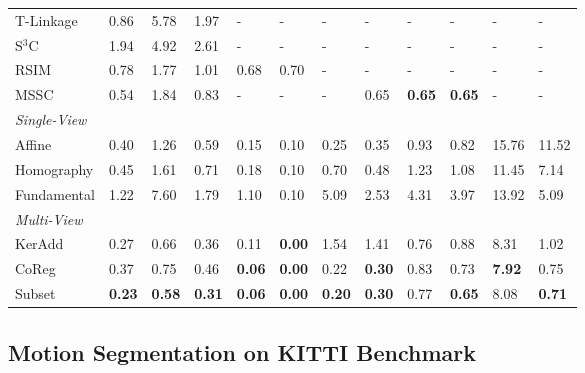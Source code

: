 \documentclass[10pt,twocolumn,letterpaper]{article}
\begin{document}
\begin{table*}[htbp]
{\begin{tabular}{llllllllllll}
    \multicolumn{1}{l}{T-Linkage \cite{Magri2014}} & 0.86  & 5.78  & 1.97  & -     & -     & -     & -     & -     & - & - & - \\
    S$^3$C  \cite{Li2015} & 1.94  & 4.92  & 2.61  & -     & -     & -     & -     & -     & - & - & - \\
    RSIM \cite{Ji2016} & 0.78 & 1.77 & 1.01 & 0.68 & 0.70 & - & - & - & - & - & - \\
    \multicolumn{1}{l}{MSSC \cite{Lai2017}} & 0.54  & 1.84  & 0.83  & -     & -     & -     & 0.65  & \textbf{0.65}  & \textbf{0.65} & - & - \\
    \midrule
    \textit{Single-View} & \multicolumn{11}{l}{} \\
    \midrule
    Affine & 0.40  & 1.26  & 0.59  & 0.15  & {0.10} &   0.25   & 0.35  & 0.93  & 0.82 & 15.76 & 11.52 \\
    Homography & 0.45  & 1.61  & 0.71  & 0.18  & {0.10} &   0.70   & 0.48  & 1.23  & 1.08 & 11.45 & 7.14 \\
    Fundamental & 1.22  & 7.60  & 1.79  & 1.10  & {0.10} &   5.09  & 2.53  & 4.31  & 3.97 & 13.92 & 5.09 \\
    \midrule
    \textit{\small{Multi-View}} & \multicolumn{11}{l}{} \\
    \midrule
    KerAdd & {0.27} & {0.66}  & 0.36  & {0.11} & \textbf{0.00} &  1.54   & 1.41  & 0.76  & 0.88 & 8.31 & 1.02 \\
    CoReg & 0.37  & {0.75} & {0.46} &   \textbf{0.06}  &  \textbf{0.00}     &   {0.22}   & \textbf{0.30} & {0.83} & {0.73} & \textbf{7.92} & {0.75} \\
     Subset & \textbf{0.23}  & \textbf{0.58} & \textbf{0.31} &   \textbf{0.06}  &  \textbf{0.00}     &   \textbf{0.20}   & \textbf{0.30} & {0.77} & \textbf{0.65} & {8.08} & \textbf{0.71} \\
    \bottomrule
    \end{tabular}}\vspace{-0.2cm}
  \label{tab:AllPerf}\end{table*}


\subsection{Motion Segmentation on KITTI Benchmark}
\end{document}
